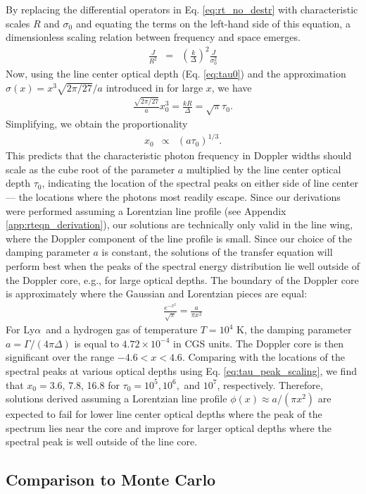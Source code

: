 \documentclass{aastex63}
\newcommand{\be}{\begin{eqnarray}}
\newcommand{\ee}{\end{eqnarray}}
\newcommand\lya{Ly$\alpha$\ }
\begin{document}
By replacing the differential operators in Eq. \ref{eq:rt_no_destr} with characteristic scales $R$ and $\sigma_0$ and equating the terms on the left-hand side of this equation, a dimensionless scaling relation between frequency and space emerges.
\be
\frac{J}{R^2} &=& \left(\frac{k}{\Delta}\right)^2 \frac{J}{\sigma_0^2}
\ee
Now, using the line center optical depth (Eq. \ref{eq:tau0}) and the approximation $\sigma(x)=x^3\sqrt{2\pi/27}/a$ introduced in \cite{1973MNRAS.162...43H} for large $x$, we have
\be
\frac{\sqrt{2\pi/27}}{a}x_0^3 = \frac{kR}{\Delta} = \sqrt{\pi} \tau_0.
\ee
Simplifying, we obtain the proportionality
\be \label{eq:tau_peak_scaling}
x_0 &\propto& \left(a\tau_0\right)^{1/3}.
\ee
This predicts that the characteristic photon frequency in Doppler widths should scale as the cube root of the parameter $a$ multiplied by the line center optical depth $\tau_0$, indicating the location of the spectral peaks on either side of line center --- the locations where the photons most readily escape. Since our derivations were performed assuming a Lorentzian line profile (see Appendix \ref{app:rteqn_derivation}), our solutions are technically only valid in the line wing, where the Doppler component of the line profile is small. Since our choice of the damping parameter $a$ is constant, the solutions of the transfer equation will perform best when the peaks of the spectral energy distribution lie well outside of the Doppler core, e.g., for large optical depths. The boundary of the Doppler core is approximately where the Gaussian and Lorentzian pieces are equal:
\be
\frac{e^{-x^2}}{\sqrt{\pi}} = \frac{a}{\pi x^2}
\ee
For \lya and a hydrogen gas of temperature $T=10^4$ K, the damping parameter $a = \Gamma / (4\pi\Delta)$ is equal to $4.72\times 10^{-4}$ in CGS units. The Doppler core is then significant over the range $-4.6 < x < 4.6$. Comparing with the locations of the spectral peaks at various optical depths using Eq. \ref{eq:tau_peak_scaling}, we find that $x_0=$3.6, 7.8, 16.8 for $\tau_0=10^5, 10^6,$ and $10^7$, respectively. Therefore, solutions derived assuming a Lorentzian line profile $\phi(x) \approx a/(\pi x^2)$ are expected to fail for lower line center optical depths where the peak of the spectrum lies near the core and improve for larger optical depths where the spectral peak is well outside of the line core.
\subsection{Comparison to Monte Carlo}
\end{document}

